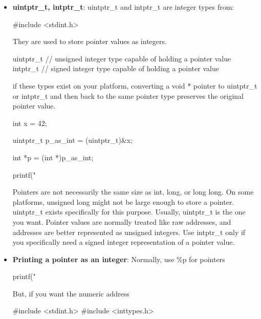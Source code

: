\documentclass{report}
\begin{document}
        \begin{itemize}
            \item \textbf{uintptr\_t, intptr\_t}: uintptr\_t and intptr\_t are integer types from:
                \bigbreak \noindent 
                \begin{cppcode}
                    #include <stdint.h>
                \end{cppcode}
                \bigbreak \noindent 
                They are used to store pointer values as integers.
                \bigbreak \noindent 
                \begin{cppcode}
                    uintptr_t  // unsigned integer type capable of holding a pointer value
                    intptr_t   // signed integer type capable of holding a pointer value
                \end{cppcode}
                \bigbreak \noindent 
                if these types exist on your platform, converting a void * pointer to uintptr\_t or intptr\_t and then back to the same pointer type preserves the original pointer value.
                \bigbreak \noindent 
                \begin{cppcode}
                    int x = 42;

                    uintptr_t p_as_int = (uintptr_t)&x;

                    int *p = (int *)p_as_int;

                    printf("%
                \end{cppcode}
                \bigbreak \noindent 
                Pointers are not necessarily the same size as int, long, or long long. On some platforms, unsigned long might not be large enough to store a pointer. uintptr\_t exists specifically for this purpose.
                \bigbreak \noindent 
                Usually, uintptr\_t is the one you want. Pointer values are normally treated like raw addresses, and addresses are better represented as unsigned integers.
                \bigbreak \noindent 
                Use intptr\_t only if you specifically need a signed integer representation of a pointer value.
            \item \textbf{Printing a pointer as an integer}: Normally, use \%p for pointers
                \bigbreak \noindent 
                \begin{cppcode}
                printf("%
                \end{cppcode}
                \bigbreak \noindent 
                But, if you want the numeric address
                \bigbreak \noindent 
                \begin{cppcode}
                #include <stdint.h>
                #include <inttypes.h>


\end{cppcode}
\end{itemize}
\end{document}
